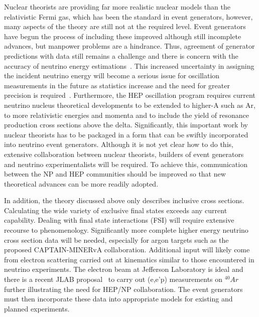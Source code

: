 Nuclear theorists are providing far more realistic nuclear models than
the relativistic Fermi gas, which has been the standard in event
generators, however, many aspects of the theory are still not at the
required level.  Event generators have begun the process of including
these improved although still incomplete advances, but manpower
problems are a hindrance. Thus, agreement of generator predictions
with data still remains a challenge and there is concern with the
accuracy of neutrino energy
estimations~\cite{Martini:2011wp,Lalakulich:2012hs,Shneor:2007tu}.
This increased uncertainty in assigning the incident neutrino energy
will become a serious issue for oscillation measurements in the future
as statistics increase and the need for greater precision is
required~\cite{1412.4294}.  Furthermore, the HEP oscillation program
requires current neutrino nucleus theoretical developments to be
extended to higher-A such as Ar, to more relativistic energies and
momenta and to include the yield of resonance production cross
sections above the delta.  Significantly, this important work by
nuclear theorists has to be packaged in a form that can be swiftly
incorporated into neutrino event generators. Although it is not yet
clear how to do this, extensive collaboration between nuclear
theorists, builders of event generators and neutrino
experimentalists will be required. To achieve this, communication
between the NP and HEP communities should be improved so that new
theoretical advances can be more readily adopted.

In addition, the theory discussed above only describes inclusive cross
sections. Calculating the wide variety of exclusive final states
exceeds any current capability. Dealing with final state interactions
(FSI) will require extensive recourse to phenomenology.  Significantly
more complete higher energy neutrino cross section data will be
needed, especially for argon targets such as the proposed
CAPTAIN-MINERvA collaboration.  Additional input will likely come from
electron scattering carried out at kinematics similar to those
encountered in neutrino experiments. The electron beam at
Jefferson Laboratory is ideal and there is a recent JLAB
proposal~\cite{Benhar:2014nca} to carry out (e,e’p) measurements on
$^{40}Ar$ further illustrating the need for HEP/NP collaboration.  The
event generators must then incorporate these data into appropriate
models for existing and planned experiments.
  


